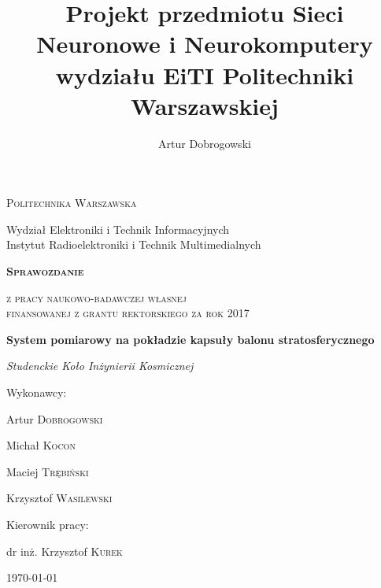 \documentclass[a4paper,12pt]{article}
\title{Projekt przedmiotu Sieci Neuronowe i Neurokomputery wydziału EiTI Politechniki Warszawskiej}
\author{Artur Dobrogowski}
\begin{document}
%
\begin{titlepage}
    \centering
    {\scshape\Large {\radikalwut Politechnika Warszawska}\\\par Wydział Elektroniki i Technik Informacyjnych\\Instytut Radioelektroniki i Technik Multimedialnych \par}
    \vspace{1cm}
    {\huge\scshape\bfseries Sprawozdanie\\\par}
    {\scshape\Large z pracy naukowo-badawczej własnej\\ finansowanej z grantu rektorskiego za rok 2017\\\par}
    \vspace{1cm}
    {\Large\bfseries System pomiarowy na pokładzie kapsuły balonu stratosferycznego\\\par}
    \vspace{1cm}
    {\Large\textsl {Studenckie Koło Inżynierii Kosmicznej}\par}
    \vfill
    Wykonawcy: \par
    {\small
    \begin{multicols}{2}

    \par Artur \textsc{Dobrogowski} 
    \par Michał \textsc{Kocon}
    \par Maciej \textsc{Trębiński}
    \par Krzysztof \textsc{Wasilewski}
    \end{multicols}
}
    Kierownik pracy:\par
    dr inż. Krzysztof \textsc{Kurek}

    \vfill

    {\large \today\par}
\end{titlepage}

\tableofcontents











% 



\label{ENDOFDOC}
\end{document}

